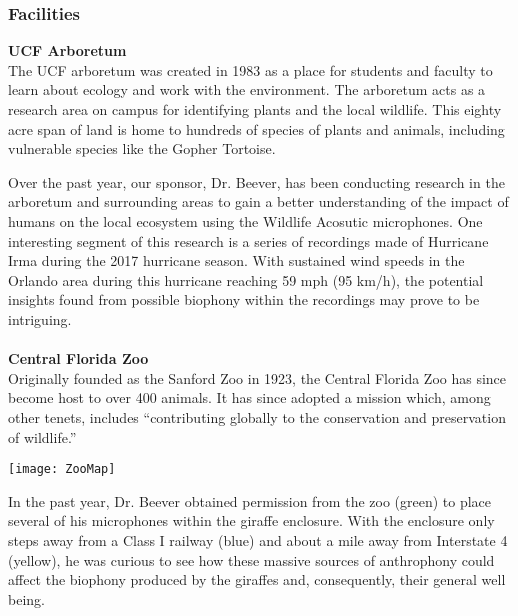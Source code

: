 \subsubsection{Facilities}
\textbf{UCF Arboretum}\\
The UCF arboretum was created in 1983 as a place for students and faculty to learn about ecology and work with the environment. The arboretum acts as a research area on campus for identifying plants and the local wildlife\cite{ucfarboretum}. This eighty acre span of land is home to hundreds of species of plants and animals, including vulnerable species like the Gopher Tortoise.\cite{pegasus}\par
Over the past year, our sponsor, Dr. Beever, has been conducting research in the arboretum and surrounding areas to gain a better understanding of the impact of humans on the local ecosystem using the Wildlife Acosutic microphones. One interesting segment of this research is a series of recordings made of Hurricane Irma during the 2017 hurricane season. With sustained wind speeds in the Orlando area during this hurricane reaching 59 mph (95 km/h),\cite{irmaspeed} the potential insights found from possible biophony within the recordings may prove to be intriguing.\\\\
\textbf{Central Florida Zoo}\\
Originally founded as the Sanford Zoo in 1923, the Central Florida Zoo has since become host to over 400 animals. It has since adopted a mission which, among other tenets, includes \enquote{contributing globally to the conservation and preservation of wildlife.}\cite{aboutzoo}\par
\begin{center}
	\texttt{[image: ZooMap]}
\end{center}
In the past year, Dr. Beever obtained permission from the zoo (green) to place several of his microphones within the giraffe enclosure. With the enclosure only steps away from a Class I railway (blue) and about a mile away from Interstate 4 (yellow), he was curious to see how these massive sources of anthrophony could affect the biophony produced by the giraffes and, consequently, their general well being.
